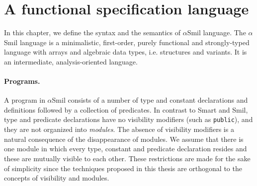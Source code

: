 \documentclass[11pt]{article}
\def\slang{\textsf{Smart}}
\newcommand{\disp}[1]{\lstinline&#1&}
\def\env{\ensuremath{E}}
\newcommand{\plainstype}[6]
{\ensuremath{\boldsymbol{struct}\{#1_{#2}: #3, \ldots, #4_{#5}: #6 \}}}
\newcommand{\plainvtype}[6]
{\ensuremath{\boldsymbol{variant}[#1_{#2}: #3 \ver \ldots \ver #4_{#5}: #6]}}
\newcommand{\plainatype}[2]
{\ensuremath{\boldsymbol{arr}^{#1} \langle #2 \rangle}}
\def\asmil{\textsf{$\alpha$Smil}}
\def\commonvval{\plainvval{C}{i}{v}}
\def\optiont{\boldsymbol{\small{variant}}
[\textrm{\disp{Some}} : \boldsymbol{\small{struct}}\{\textrm{\disp{t}} : \textrm{\disp{T}}\} \; 
\arrowvert\; 
\; \textrm{\disp{None}} : \boldsymbol{\small{struct}}\{\}]}
\newcommand{\ver}{\arrowvert \;}
\begin{document}
\section{A functional specification language}



\def\commonstypeother{\plainstype{f'}{1}{\tau'_1}{f'}{n}{\tau'_n}}

\def\commonvtypeother{\plainvtype{C'}{1}{\tau'_1}{C'}{n}{\tau'_n}}

\def\commonatypeother{\plainatype{\tau'_i}{\tau'}}

\newcommand{\plainvval}[3] {\ensuremath{#1_{#2}[#3] }}

\def\commonvval{\plainvval{C}{i}{v}}

\newcommand{\semstm}[1]{[#1]}
\newcommand{\config}[2]{\ensuremath{\big \langle #1, \semstm{#2} \big
    \rangle}} \def\defconfig{\config{\env}{s}}
\newcommand{\extendEnv}[2]{\ensuremath{\env\left[#1 \to #2\right]}}

\newcommand{\transto}[1]{\xrightarrow{#1}}

\def\asmil{\textsf{$\alpha$Smil}}

\def\optiont{\boldsymbol{\small{variant}} [\textrm{\disp{Some}} :
    \boldsymbol{\small{struct}}\{\textrm{\disp{t}} :
    \textrm{\disp{T}}\} \; \arrowvert\; \; \textrm{\disp{None}} :
    \boldsymbol{\small{struct}}\{\}]}

In this chapter, we define the syntax and the semantics of {\asmil}
language. 
The {\asmil} language is a minimalistic, first-order, purely functional and strongly-typed 
language with arrays and algebraic data types, i.e. structures and variants.
It is an intermediate, analysis-oriented language.

\paragraph{Programs.} A program in {\asmil} consists of a number of type and 
constant declarations and definitions followed by a collection of predicates. In 
contrast to {\slang} and {\textsf{Smil}}, type and predicate declarations have 
no visibility modifiers (such as \disp{public}), and they are not organized into 
\emph{modules}. The absence of visibility modifiers is a natural consequence of 
the disappearance of modules. We assume that there is one module in which every 
type, constant and predicate declaration resides and these are mutually visible to 
each other. These restrictions are made for the sake of simplicity since the 
techniques proposed in this thesis are orthogonal to the concepts of visibility 
and modules.
\end{document}
